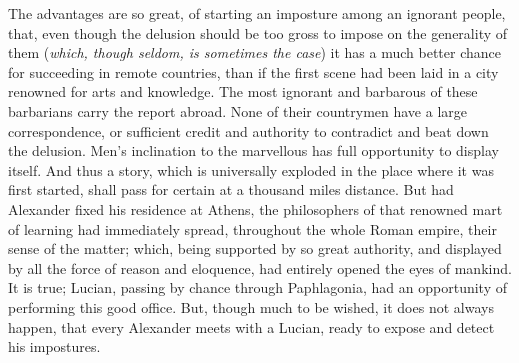 \documentclass[]{article}
\begin{document}
\begin{sectionbody}
\humeparagraph  The advantages are so great, of starting an imposture among an ignorant people, that, even though the delusion should be too gross to impose on the generality of them (\emph{which, though seldom, is sometimes the case}) it has a much better chance for succeeding in remote countries, than if the first scene had been laid in a city renowned for arts and knowledge. The most ignorant and barbarous of these barbarians carry the report abroad. None of their countrymen have a large correspondence, or sufficient credit and authority to contradict and beat down the delusion. Men's inclination to the marvellous has full opportunity to display itself. And thus a story, which is universally exploded in the place where it was first started, shall pass for certain at a thousand miles distance. But had Alexander fixed his residence at Athens, the philosophers of that renowned mart of learning had immediately spread, throughout the whole Roman empire, their sense of the matter; which, being supported by so great authority, and displayed by all the force of reason and eloquence, had entirely opened the eyes of mankind. It is true; Lucian, passing by chance through Paphlagonia, had an opportunity of performing this good office. But, though much to be wished, it does not always happen, that every Alexander meets with a Lucian, ready to expose and detect his impostures.


\end{sectionbody}
\end{document}
